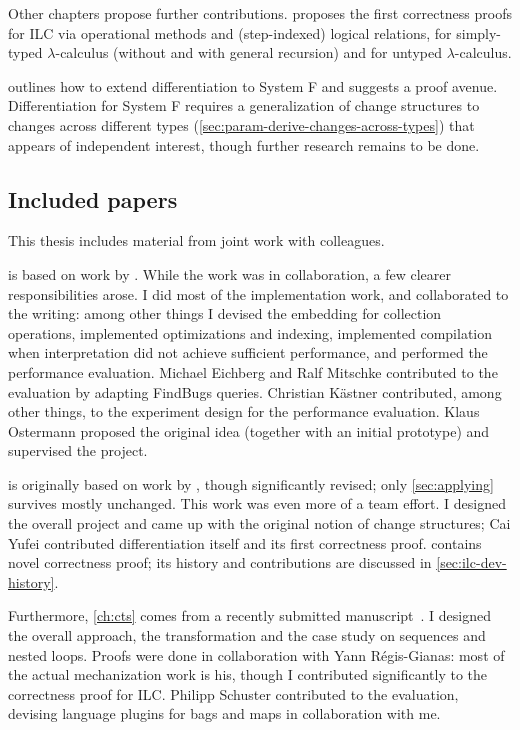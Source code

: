 
Other chapters propose further contributions.
 proposes the first correctness proofs for ILC via operational
methods and (step-indexed) logical relations, for simply-typed $\lambda$-calculus
(without and with general recursion) and for untyped $\lambda$-calculus.

 outlines how to extend differentiation to
System F and suggests a proof avenue. Differentiation for System F requires a
generalization of change structures to changes across different types
(\cref{sec:param-derive-changes-across-types}) that appears of independent
interest, though further research remains to be done.

\subsection{Included papers}
This thesis includes material from joint work with colleagues.

 is based on work by \citet*{GiarrussoAOSD13}. While the
work was in collaboration, a few clearer responsibilities arose.
I did most of the implementation work, and collaborated to the writing: among
other things I devised the embedding for collection operations, implemented
optimizations and indexing, implemented compilation when interpretation did not
achieve sufficient performance, and performed the performance evaluation.
Michael Eichberg and Ralf Mitschke contributed to the evaluation by adapting
FindBugs queries.
Christian K{\"{a}}stner contributed, among other things, to the experiment
design for the performance evaluation. Klaus Ostermann proposed the original
idea (together with an initial prototype) and supervised the project.

 is originally based on work by \citet*{CaiEtAl2014ILC}, though
significantly revised; only \cref{sec:applying} survives mostly unchanged.
This work was even more of a team effort. I designed the
overall project and came up with the original notion of change structures; Cai
Yufei contributed differentiation itself and its first correctness proof.
 contains novel correctness proof; its history and
contributions are discussed in \cref{sec:ilc-dev-history}.

Furthermore, \cref{ch:cts} comes from a recently submitted
manuscript~\citep*{Giarrusso2018Static}. I
designed the overall approach, the transformation and the case study on
sequences and nested loops. Proofs were done in collaboration with Yann
Régis-Gianas: most of the actual mechanization work is his, though I contributed significantly to the
correctness proof for ILC. Philipp Schuster contributed to the evaluation,
devising language plugins for bags and maps in collaboration with me.

